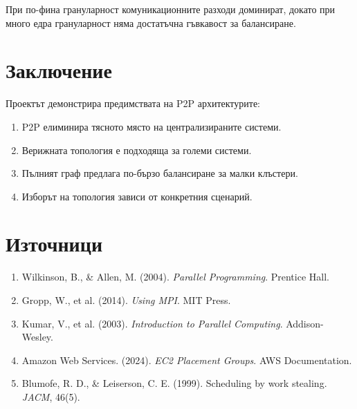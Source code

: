 \documentclass[12pt,a4paper]{article}
\begin{document}
При по-фина грануларност комуникационните разходи доминират, докато при много едра грануларност няма достатъчна гъвкавост за балансиране.

\section{Заключение}

Проектът демонстрира предимствата на P2P архитектурите:

\begin{enumerate}
    \item P2P елиминира тясното място на централизираните системи.
    \item Верижната топология е подходяща за големи системи.
    \item Пълният граф предлага по-бързо балансиране за малки клъстери.
    \item Изборът на топология зависи от конкретния сценарий.
\end{enumerate}

\section*{Източници}

\begin{enumerate}
    \item Wilkinson, B., \& Allen, M. (2004). \textit{Parallel Programming}. Prentice Hall.
    \item Gropp, W., et al. (2014). \textit{Using MPI}. MIT Press.
    \item Kumar, V., et al. (2003). \textit{Introduction to Parallel Computing}. Addison-Wesley.
    \item Amazon Web Services. (2024). \textit{EC2 Placement Groups}. AWS Documentation.
    \item Blumofe, R. D., \& Leiserson, C. E. (1999). Scheduling by work stealing. \textit{JACM}, 46(5).
\end{enumerate}
\end{document}
